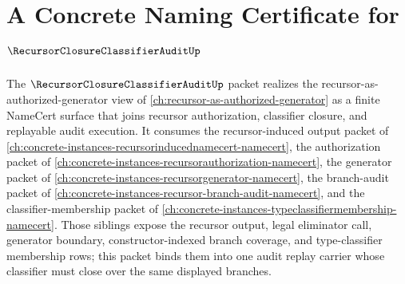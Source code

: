 \chapter{A Concrete Naming Certificate for $\RecursorClosureClassifierAuditUp$}
\label{ch:concrete-instances-recursor-closure-classifier-audit-namecert}

The $\RecursorClosureClassifierAuditUp$ packet realizes the recursor-as-authorized-generator view of \autoref{ch:recursor-as-authorized-generator} as a finite NameCert surface that joins recursor authorization, classifier closure, and replayable audit execution. It consumes the recursor-induced output packet of \autoref{ch:concrete-instances-recursorinducednamecert-namecert}, the authorization packet of \autoref{ch:concrete-instances-recursorauthorization-namecert}, the generator packet of \autoref{ch:concrete-instances-recursorgenerator-namecert}, the branch-audit packet of \autoref{ch:concrete-instances-recursor-branch-audit-namecert}, and the classifier-membership packet of \autoref{ch:concrete-instances-typeclassifiermembership-namecert}. Those siblings expose the recursor output, legal eliminator call, generator boundary, constructor-indexed branch coverage, and type-classifier membership rows; this packet binds them into one audit replay carrier whose classifier must close over the same displayed branches.

